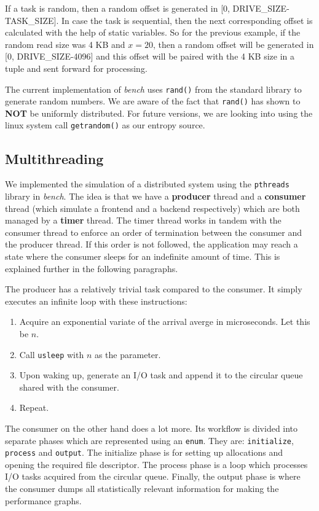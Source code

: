 \documentclass[10pt, author, twocolumn]{article}
\begin{document}
If a task is random, then a random offset is generated in [0, DRIVE\_SIZE-TASK\_SIZE]. In case the task is sequential, then the next corresponding offset is calculated with the help of static variables. So for the previous example, if the random read size was 4 KB and $x = 20$, then a random offset will be generated in [0, DRIVE\_SIZE-4096] and this offset will be paired with the 4 KB size in a tuple and sent forward for processing.

The current implementation of \textit{bench} uses \texttt{rand()} from the standard library to generate random numbers. We are aware of the fact that \texttt{rand()} has shown to \textbf{NOT} be uniformly distributed. For future versions, we are looking into using the linux system call \texttt{getrandom()} as our entropy source. 

\subsection{Multithreading}
We implemented the simulation of a distributed system using the \texttt{pthreads} library in \textit{bench}. The idea is that we have a \textbf{producer} thread and a \textbf{consumer} thread (which simulate a frontend and a backend respectively) which are both managed by a \textbf{timer} thread. The timer thread works in tandem with the consumer thread to enforce an order of termination between the consumer and the producer thread. If this order is not followed, the application may reach a state where the consumer sleeps for an indefinite amount of time. This is explained further in the following paragraphs.

The producer has a relatively trivial task compared to the consumer. It simply executes an infinite loop with these instructions: 

\begin{enumerate}
    \item Acquire an exponential variate of the arrival averge in microseconds. Let this be $n$.
    \item Call \texttt{usleep} with $n$ as the parameter. 
    \item Upon waking up, generate an I/O task and append it to the circular queue shared with the consumer. 
    \item Repeat. 
\end{enumerate}

The consumer on the other hand does a lot more. Its workflow is divided into separate phases which are represented using an \texttt{enum}. They are: \texttt{initialize}, \texttt{process} and \texttt{output}. The initialize phase is for setting up allocations and opening the required file descriptor. The process phase is a loop which processes I/O tasks acquired from the circular queue. Finally, the output phase is where the consumer dumps all statistically relevant information for making the performance graphs. 
\end{document}
